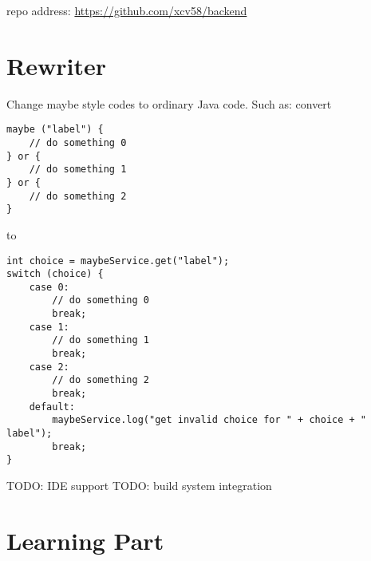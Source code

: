 \documentclass{article}
\begin{document}
repo address: \url{https://github.com/xcv58/backend}

\section{Rewriter}
\label{sec:rewriter}
Change maybe style codes to ordinary Java code. Such as:
convert
\begin{verbatim}
maybe ("label") {
    // do something 0
} or {
    // do something 1
} or {
    // do something 2
}

\end{verbatim}
to
\begin{verbatim}
int choice = maybeService.get("label");
switch (choice) {
    case 0:
        // do something 0
        break;
    case 1:
        // do something 1
        break;
    case 2:
        // do something 2
        break;
    default:
        maybeService.log("get invalid choice for " + choice + " label");
        break;
}
\end{verbatim}
TODO: IDE support
TODO: build system integration

\section{Learning Part}
\label{sec:learning-part}
\end{document}
